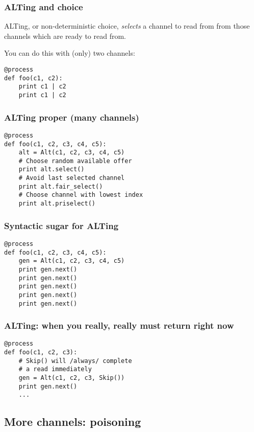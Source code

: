 \documentclass{beamer}
\begin{document}
\begin{frame}[fragile]
  \frametitle{ALTing and choice}
  \begin{definition}
    ALTing, or non-deterministic choice, \emph{selects} a channel to
    read from from those channels which are ready to read from.
  \end{definition}
You can do this with (only) two channels:
  \begin{lstlisting}[language=python_new]
@process
def foo(c1, c2):
    print c1 | c2
    print c1 | c2
  \end{lstlisting}
\end{frame}


\begin{frame}[fragile]
  \frametitle{ALTing proper (many channels)}
  \begin{lstlisting}[language=python_new]
@process
def foo(c1, c2, c3, c4, c5):
    alt = Alt(c1, c2, c3, c4, c5)
    # Choose random available offer
    print alt.select()
    # Avoid last selected channel
    print alt.fair_select() 
    # Choose channel with lowest index
    print alt.priselect()   
  \end{lstlisting}
\end{frame}


\begin{frame}[fragile]
  \frametitle{Syntactic sugar for ALTing}
  \begin{lstlisting}[language=python_new]
@process
def foo(c1, c2, c3, c4, c5):
    gen = Alt(c1, c2, c3, c4, c5)
    print gen.next()
    print gen.next()
    print gen.next()
    print gen.next()
    print gen.next()
  \end{lstlisting}
\end{frame}


\begin{frame}[fragile]
  \frametitle{ALTing: when you really, really must return right now}
  \begin{lstlisting}[language=python_new]
@process
def foo(c1, c2, c3):
    # Skip() will /always/ complete 
    # a read immediately
    gen = Alt(c1, c2, c3, Skip())
    print gen.next()
    ...
  \end{lstlisting}
\end{frame}


\subsection{More channels: poisoning}
\end{document}
